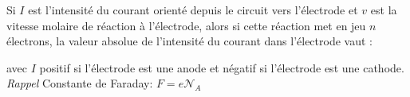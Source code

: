 ﻿\documentclass[a4paper]{article}
\begin{document}
\pagestyle{fancy}
\fancyhf{}
\setlength{\headheight}{15pt}

\begin{center}
	\large{}
\end{center}


Si \(I\) est l'intensité du courant orienté depuis le circuit vers l'électrode et \(v\) est la vitesse molaire de réaction à l'électrode, alors si cette réaction met en jeu \(n\) électrons, la valeur absolue de l'intensité du courant dans l'électrode vaut :\begin{center}
\end{center}
avec \(I\) positif si l'électrode est une anode et négatif si l'électrode est une cathode.\\
\emph{Rappel} Constante de Faraday: \(F = e \mathcal{N}_A\)
\end{document}
